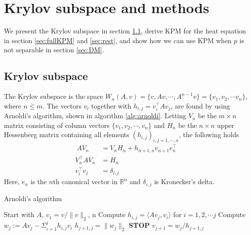 \chapter{Krylov subspace and methods}%
We present the Krylov subspace in section \ref{sec:subspace}, derive KPM for the heat equation in section \ref{sec:fullKPM} and \ref{sec:rest}, and show how we can use KPM when $p$ is not separable in section \ref{sec:DM}.
\label{sec:krylov}

\section{Krylov subspace} \label{sec:subspace}
The Krylov subspace is the space $W_n (A,v) = \{v,Av, \cdots, A^{n-1}v\} = \{v_1,v_2,\cdots v_n\} $, where $n \leq m$. %
The vectors $v_i$ together with $h_{i,j} = v_i^\top Av_j$, are found by using Arnoldi's algorithm, shown in algorithm \ref{alg:arnoldi}. Letting $V_n$ be the $m \times n$ matrix consisting of column vectors $\{v_1,v_2,\cdots,v_n \}$ and $H_n$ be the $n \times n$ upper Hessenberg matrix containing all elements $(h_{i,j})_{i,j=1,\cdots,n}$, the following holds \cite{krylovprop}
\begin{align}\
AV_n & = V_n H_n + h_{n+1,n}v_{n+1}e^\top_n \label{eqn:prop1} \\
V^{\top}_n AV_n &= H_n \label{eqn:prop2} \\
v_i^{\top} v_j &= \delta_{i,j} \label{eqn:prop3}
\end{align}
Here, $e_n$ is the $n$th canonical vector in $\mathbb{R}^n$ and $\delta_{i,j}$ is Kronecker's delta.\\




\begin{algorithm} 
\begin{algorithmic} \caption{Arnoldi's algorithm\cite{arnold}} \label{alg:arnoldi}  
\STATE Start with $A$, $v_1 = v/\|v \|_2$, n
   \STATE Compute $h_{i,j} = \langle Av_j,v_i \rangle $ for $i = 1,2,\cdots j$
    \STATE Compute $w_j := A v_j - \Sigma_{i=1}^{j} h_{i,j}v_i $
    \STATE $h_{j+1,j} = \| w_j \|_2$
        \STATE\textbf{STOP}
    \ENDIF 
   \STATE $v_{j+1} = w_j/h_{j+1,j}$
\ENDFOR
\end{algorithmic} 
\end{algorithm}
